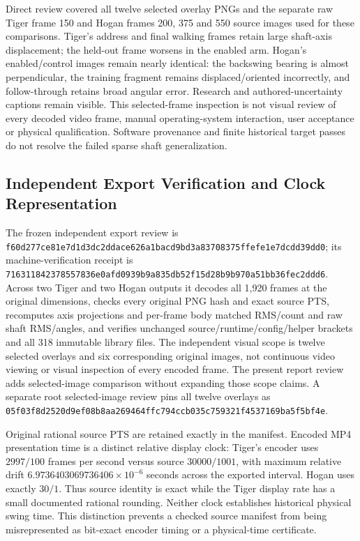 \documentclass[11pt,letterpaper]{article}
\newcommand{\hash}[1]{{\footnotesize\nolinkurl{#1}}}
\begin{document}
Direct review covered all twelve selected overlay PNGs and the separate raw
Tiger frame 150 and Hogan frames 200, 375 and 550 source images used for these comparisons. Tiger's
address and final walking frames retain large shaft-axis displacement; the
held-out frame worsens in the enabled arm. Hogan's enabled/control images
remain nearly identical: the backswing bearing is almost perpendicular, the
training fragment remains displaced/oriented incorrectly, and follow-through
retains broad angular error. Research and authored-uncertainty captions remain
visible. This selected-frame inspection is not visual review of every decoded
video frame, manual operating-system interaction, user acceptance or physical
qualification. Software provenance and finite historical target passes do
not resolve the failed sparse shaft generalization.

\subsection{Independent Export Verification and Clock Representation}
The frozen independent export review is
\hash{f60d277ce81e7d1d3dc2ddace626a1bacd9bd3a83708375ffefe1e7dcdd39dd0};
its machine-verification receipt is
\hash{716311842378557836e0afd0939b9a835db52f15d28b9b970a51bb36fec2ddd6}.
Across two Tiger and two Hogan outputs it decodes all 1,920 frames at the
original dimensions, checks every original PNG hash and exact source PTS,
recomputes axis projections and per-frame body matched RMS/count and raw shaft
RMS/angles, and verifies unchanged source/runtime/config/helper brackets and
all 318 immutable library files. The independent visual scope is twelve
selected overlays and six corresponding original images, not continuous video
viewing or visual inspection of every encoded frame. The present report review
adds selected-image comparison without expanding those scope claims. A separate
root selected-image review pins all twelve overlays as
\hash{05f03f8d2520d9ef08b8aa269464ffc794ccb035c759321f4537169ba5f5bf4e}.

Original rational source PTS are retained exactly in the manifest. Encoded
MP4 presentation time is a distinct relative display clock: Tiger's encoder
uses $2997/100$ frames per second versus source $30000/1001$, with maximum
relative drift $6.9736403069736406\times10^{-6}$ seconds across the exported
interval. Hogan uses exactly $30/1$. Thus source identity is exact while the
Tiger display rate has a small documented rational rounding. Neither clock
establishes historical physical swing time. This distinction prevents a checked
source manifest from being misrepresented as bit-exact encoder timing or a
physical-time certificate.
\end{document}
